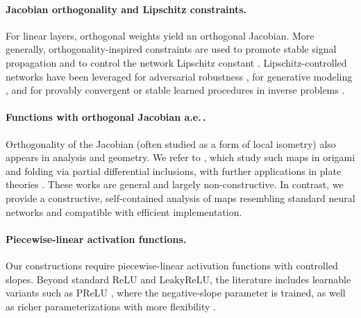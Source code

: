 \documentclass{article}
\theoremstyle{plain}
\theoremstyle{definition}
\theoremstyle{definition}
\theoremstyle{remark}
\theoremstyle{definition}
\theoremstyle{definition}
\theoremstyle{remark}
\numberwithin{equation}{section}
\begin{document}
\paragraph{Jacobian orthogonality and Lipschitz constraints.} For linear layers, orthogonal weights yield an orthogonal Jacobian. More generally, orthogonality-inspired constraints are used to promote stable signal propagation and to control the network Lipschitz constant \cite{wang2020orthogonal,singla2021skew,trockman2021orthogonalizing}. Lipschitz-controlled networks have been leveraged for adversarial robustness \cite{tsuzuku2018lipschitz,sherry2024designing,trockman2021orthogonalizing,prach20241,meunier2022dynamical}, for generative modeling \cite{gulrajani2017improved,miyato2018spectral,lunz2018adversarial}, and for provably convergent or stable learned procedures in inverse problems \cite{sherry2024designing,ryu2019plug,hertrich2021convolutional}.

\paragraph{Functions with orthogonal Jacobian a.e.\,.} Orthogonality of the Jacobian (often studied as a form of local isometry) also appears in analysis and geometry. We refer to \cite{dacorogna2008lipschitz,chambolle2007piecewise,dacorogna2010functions,caboussat2019numerical}, which study such maps in origami and folding via partial differential inclusions, with further applications in plate theories \cite{kirchheim2003,conti2008confining}. These works are general and largely non-constructive. In contrast, we provide a constructive, self-contained analysis of maps resembling standard neural networks and compatible with efficient implementation.

\paragraph{Piecewise-linear activation functions.} Our constructions require piecewise-linear activation functions with controlled slopes. Beyond standard $\mathrm{ReLU}$ and $\mathrm{Leaky\mathrm{ReLU}}$, the literature includes learnable variants such as $\mathrm{PReLU}$ \cite{he2015delving}, where the negative-slope parameter is trained, as well as richer parameterizations with more flexibility \cite{zhou2021learning,jin2016deep,bohra2020learning}.
\end{document}
